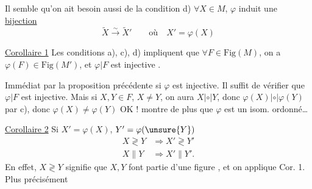 
Il semble qu'on ait besoin aussi de la condition
 d) $\forall X\in M$, $\varphi$ induit une \uline{bijection}
\[
\widetilde X\xrightarrow{\sim}\widetilde X'\qquad\text{où}\quad X'=\varphi(X)
\]

\uline{Corollaire 1} Les conditions a), c), d) impliquent que $\forall F\in\mathrm{Fig}(M)$, on a $\varphi(F)\in\mathrm{Fig}(M')$, et $\varphi|F$ est injective .

Immédiat par la proposition précédente  si $\varphi$ est injective.  Il suffit de vérifier que $\varphi|F$ est injective. Mais si $X,Y\in F$,  $X\ne Y$, on aura $X\mathrel{|\circ|}Y$, donc $\varphi(X)\mathrel{|\circ|}\varphi(Y)$ par c), donc $\varphi(X)\ne\varphi(Y)$ OK !   montre de plus que $\varphi$ est un isom. ordonné\ldots

\uline{Corollaire 2}\quad{} Si $X'=\varphi(X)$, $Y'=\varphi(\unsure{Y})$
\[
\begin{aligned}
X\gtrless Y&\Longrightarrow X'\gtrless Y'\\
X\parallel Y&\Longrightarrow X'\parallel Y'.
\end{aligned}
\]
En effet, $X\gtrless Y$ signifie que $X,Y$ font partie d'une figure , et on applique Cor. 1. Plus  précisément

